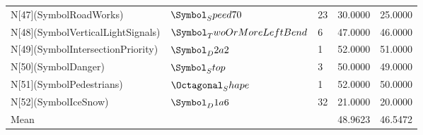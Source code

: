 \begin{tabular}{lllll}
N[47](SymbolRoadWorks) & $\Symbol_Speed70$ & 23 & 30.0000 & 25.0000 \\
N[48](SymbolVerticalLightSignals) & $\Symbol_TwoOrMoreLeftBend$ & 6 & 47.0000 & 46.0000 \\
N[49](SymbolIntersectionPriority) & $\Symbol_D2a2$ & 1 & 52.0000 & 51.0000 \\
N[50](SymbolDanger) & $\Symbol_Stop$ & 3 & 50.0000 & 49.0000 \\
N[51](SymbolPedestrians) & $\Octagonal_Shape$ & 1 & 52.0000 & 50.0000 \\
N[52](SymbolIceSnow) & $\Symbol_D1a6$ & 32 & 21.0000 & 20.0000 \\
Mean &  &  & 48.9623 & 46.5472 \\
\bottomrule
\end{tabular}
